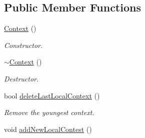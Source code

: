 \subsection*{Public Member Functions}
\begin{DoxyCompactItemize}
\item 
\hypertarget{class_context_a652cdcd2eedc8dbd9110bd284c5d5cf0}{\hyperlink{class_context_a652cdcd2eedc8dbd9110bd284c5d5cf0}{Context} ()}\label{class_context_a652cdcd2eedc8dbd9110bd284c5d5cf0}

\begin{DoxyCompactList}\small\item\em Constructor. \end{DoxyCompactList}\item 
\hypertarget{class_context_a2d34e4556448e40693f61d15e091b604}{\hyperlink{class_context_a2d34e4556448e40693f61d15e091b604}{$\sim$\-Context} ()}\label{class_context_a2d34e4556448e40693f61d15e091b604}

\begin{DoxyCompactList}\small\item\em Destructor. \end{DoxyCompactList}\item 
bool \hyperlink{class_context_a749420a035d008bb388fb2d737f973b0}{delete\-Last\-Local\-Context} ()
\begin{DoxyCompactList}\small\item\em Remove the youngest context. \end{DoxyCompactList}\item 
\hypertarget{class_context_a06fd882c9625b60a6130ab1e4537e38e}{void \hyperlink{class_context_a06fd882c9625b60a6130ab1e4537e38e}{add\-New\-Local\-Contest} ()}\label{class_context_a06fd882c9625b60a6130ab1e4537e38e}


\end{DoxyCompactItemize}
